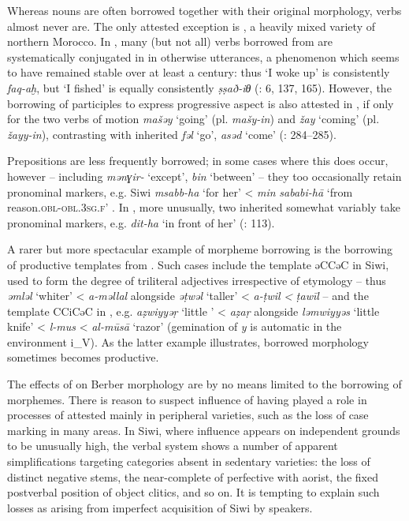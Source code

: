 \documentclass[output=paper]{langsci/langscibook}
\begin{document}
Whereas nouns are often borrowed together with their original  morphology, verbs almost never are. The only attested exception is , a heavily mixed variety of northern Morocco.  In , many (but not all) verbs borrowed from  are systematically conjugated in  in otherwise  utterances, a phenomenon which seems to have remained stable over at least a century: thus `I woke up' is consistently \textit{faq-aḫ}, but `I fished' is equally consistently \textit{ṣṣað-iθ} (\citealt{Mourigh2016}: 6, 137, 165). However, the borrowing of  participles to express progressive aspect is also attested in , if only for the two verbs of motion \textit{mašəy} `going' (pl. \textit{mašy-in}) and \textit{žay} `coming' (pl. \textit{žayy-in}), contrasting with inherited \textit{fəl} `go', \textit{asəd} `come' (\citealt{Kossmann2013book}: 284–285).

Prepositions are less frequently borrowed; in some cases where this does occur, however – including  \textit{mənɣir-} `except',  \textit{bin} `between' \citep[293]{Kossmann2013book} – they too occasionally retain  pronominal markers, e.g. Siwi \textit{msabb-ha} `for her' < \textit{min} \textit{sababi-hā}  `from reason.\textsc{obl}{}-\textsc{obl.3sg.f}' \citep[48]{Souag2013book}.  In , more unusually, two inherited  somewhat variably take  pronominal markers, e.g. \textit{dit-ha} `in front of her' (\citealt{vanPutten2014}: 113).

A rarer but more spectacular example of morpheme borrowing is the borrowing of productive templates from . Such cases include the  template əCCəC in Siwi, used to form the  degree of triliteral adjectives irrespective of etymology – thus \textit{əmləl} `whiter' < \textit{a-məllal} alongside \textit{əṭwəl} `taller' < \textit{a-ṭwil} \textit{<}  \textit{ṭawīl} \citep{Souag2009} – and the  template CCiCəC in  \citep{Mourigh2016}, e.g. \textit{aẓwiyyəṛ} `little ' < \textit{aẓaṛ} alongside \textit{ləmwiyyəs} `little knife' < \textit{l-mus} <  \textit{al-mūsā} `razor' (gemination of \textit{y} is automatic in the environment i\_V). As the latter example illustrates, borrowed  morphology sometimes becomes productive.

The effects of  on Berber morphology are by no means limited to the borrowing of morphemes. There is reason to suspect  influence of having played a role in processes of  attested mainly in peripheral varieties, such as the loss of case marking in many areas. In Siwi, where  influence appears on independent grounds to be unusually high, the verbal system shows a number of apparent simplifications targeting categories absent in sedentary  varieties: the loss of distinct negative stems, the near-complete  of perfective with aorist, the fixed postverbal position of object clitics, and so on. It is tempting to explain such losses as arising from imperfect acquisition of Siwi by  speakers.
\end{document}

